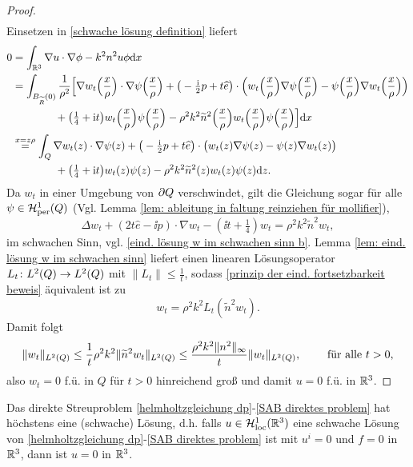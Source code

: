 \begin{proof}
\begin{align*}
	\end{align*}
	Einsetzen in \eqref{schwache lösung definition} liefert
	\begin{align*}
		0&=\int_{\mathbb{R}^3}\nabla u\cdot\nabla\phi-k^2n^2u\phi\mathrm{d}x\\
		&=\int_{B_{\widetilde{R}}(0)}\frac{1}{\rho^2}\Big[\nabla w_t\Big(\frac{x}{\rho}\Big)\cdot\nabla\psi\Big(\frac{x}{\rho}\Big)+\big(-\tfrac{\mathrm{i}}{2}p+t\widehat{e}\big)\cdot\Big(w_t\Big(\frac{x}{\rho}\Big)\nabla\psi\Big(\frac{x}{\rho}\Big)-\psi\Big(\frac{x}{\rho}\Big)\nabla w_t\Big(\frac{x}{\rho}\Big)\Big)\\
		&\qquad\qquad+\big(\tfrac{1}{4}+\mathrm{i} t\big)w_t\Big(\frac{x}{\rho}\Big)\psi\Big(\frac{x}{\rho}\Big)-\rho^2k^2\widetilde{n}^2\Big(\frac{x}{\rho}\Big)w_t\Big(\frac{x}{\rho}\Big)\psi\Big(\frac{x}{\rho}\Big)\Big]\mathrm{d}x\\
		&\overset{\scriptsize x=z\rho}{=}
		\int_Q\nabla w_t(z)\cdot\nabla\psi(z)+\big(-\tfrac{\mathrm{i}}{2}p+t\widehat{e}\big)\cdot\big(w_t(z)\nabla\psi(z)-\psi(z)\nabla w_t(z)\big)\\
		&\qquad\qquad+\big(\tfrac{1}{4}+\mathrm{i} t\big)w_t(z)\psi(z)-\rho^2k^2\widetilde{n}^2(z)w_t(z)\psi(z)\mathrm{d}z.
	\end{align*}
	Da \(w_t\) in einer Umgebung von \(\partial Q\) verschwindet, gilt die Gleichung sogar für alle \(\psi\in\mathcal{H}_{\mathrm{per}}^1(Q)\) (Vgl. Lemma \ref{lem: ableitung in faltung reinziehen für mollifier}),
	\begin{equation}
		\label{prinzip der eind. fortsetzbarkeit beweis}
		\Delta w_t+(2t\widehat{e}-\ii p)\cdot \nabla w_t-(\ii t+\tfrac{1}{4})w_t=\rho^2k^2\widetilde{n}^2w_t,
	\end{equation}
	im schwachen Sinn, vgl. \eqref{eind. lösung w im schwachen sinn b}. Lemma \ref{lem: eind. lösung w im schwachen sinn} liefert einen linearen Lösungsoperator \(L_t\colon L^2(Q) \to L^2(Q)\) mit \(\|L_t\|\leq\frac{1}{t}\), sodass \eqref{prinzip der eind. fortsetzbarkeit beweis} äquivalent ist zu
	\begin{equation*}
		w_t=\rho^2k^2L_t(\widetilde{n}^2w_t).
	\end{equation*}
	Damit folgt
	\begin{equation*}
		\|w_t\|_{L^2(Q)}\leq\frac{1}{t}\rho^2k^2\|\widetilde{n}^2w_t\|_{L^2(Q)}\leq\frac{\rho^2k^2\|n^2\|_\infty}{t}\|w_t\|_{L^2(Q)},\qquad\text{ für alle }t>0,
	\end{equation*}
	also \(w_t=0\) f.ü. in \(Q\) für \(t>0\) hinreichend groß und damit \(u=0\) f.ü. in \(\mathbb{R}^3\).
\end{proof}
\begin{satz}\label{satz: eindeutigkeit von Lösungen des direkten Streuproblems}
	Das direkte Streuproblem \eqref{helmholtzgleichung dp}-\eqref{SAB direktes problem} hat höchstens eine (schwache) Lösung, d.h. falls \(u\in\mathcal{H}_{\mathrm{loc}}^1(\mathbb{R}^3)\) eine schwache Lösung von \eqref{helmholtzgleichung dp}-\eqref{SAB direktes problem} ist mit \(u^i=0\) und \(f=0\) in \(\mathbb{R}^3\), dann ist \(u=0\) in \(\mathbb{R}^3\).
\end{satz}
